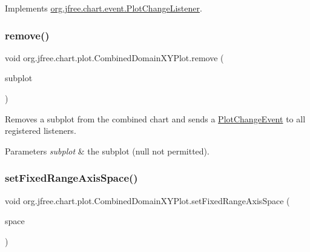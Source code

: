 Implements \mbox{\hyperlink{interfaceorg_1_1jfree_1_1chart_1_1event_1_1_plot_change_listener_aff1bdd2cc91287021b58a2ae67aa159d}{org.\+jfree.\+chart.\+event.\+Plot\+Change\+Listener}}.

\mbox{\label{classorg_1_1jfree_1_1chart_1_1plot_1_1_combined_domain_x_y_plot_a7f9352e13315496bb8a012453358891b}} 
\subsubsection{\texorpdfstring{remove()}{remove()}}
{\footnotesize\ttfamily void org.\+jfree.\+chart.\+plot.\+Combined\+Domain\+X\+Y\+Plot.\+remove (\begin{DoxyParamCaption}\item[{\mbox{\hyperlink{classorg_1_1jfree_1_1chart_1_1plot_1_1_x_y_plot}{X\+Y\+Plot}}}]{subplot }\end{DoxyParamCaption})}

Removes a subplot from the combined chart and sends a \mbox{\hyperlink{}{Plot\+Change\+Event}} to all registered listeners.


\begin{DoxyParams}{Parameters}
{\em subplot} & the subplot ({\ttfamily null} not permitted). \\
\hline
\end{DoxyParams}
\mbox{\label{classorg_1_1jfree_1_1chart_1_1plot_1_1_combined_domain_x_y_plot_a1aaffea04f5f4fa114ffda688c17e3b0}} 
\subsubsection{\texorpdfstring{set\+Fixed\+Range\+Axis\+Space()}{setFixedRangeAxisSpace()}}
{\footnotesize\ttfamily void org.\+jfree.\+chart.\+plot.\+Combined\+Domain\+X\+Y\+Plot.\+set\+Fixed\+Range\+Axis\+Space (\begin{DoxyParamCaption}\item[{\mbox{\hyperlink{classorg_1_1jfree_1_1chart_1_1axis_1_1_axis_space}{Axis\+Space}}}]{space }\end{DoxyParamCaption})}


